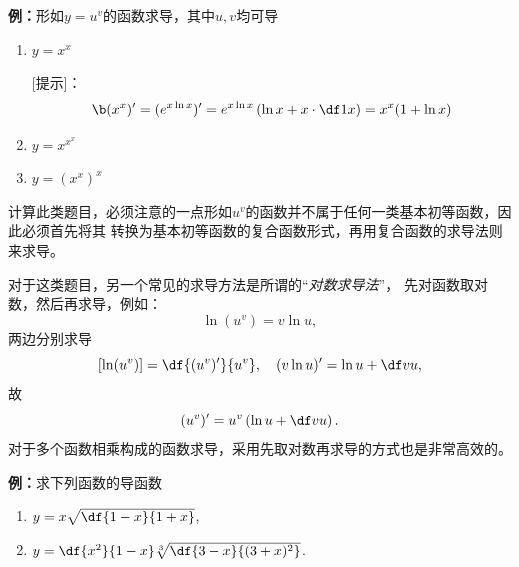 {\bf 例：}形如$y=u^v$的函数求导，其中$u,v$均可导
\begin{enumerate}[(1)]
  \setlength{\itemindent}{1cm}
  \item $y=x^x$
  
  [提示]：
  $${\b (x^x)'=(e^{x\ln x})'=e^{x\ln x}\left(\ln x+x\cdot\df1x\right)
  =x^x(1+\ln x)}$$
  \item $y=x^{x^x}$
  \item $y=\left(x^x\right)^x$
\end{enumerate}

计算此类题目，必须注意的一点形如$u^v$的函数并不属于任何一类基本初等函数，因此必须首先将其
转换为基本初等函数的复合函数形式，再用复合函数的求导法则来求导。

对于这类题目，另一个常见的求导方法是所谓的“{\it 对数求导法}”，
先对函数取对数，然后再求导，例如：
$$\ln(u^v)=v\ln u,$$
两边分别求导
$$[\ln(u^v)]=\df{(u^v)'}{u^v},
\quad (v\ln u)'=\ln u+\df vu,$$
故
$$(u^v)'=u^v\left(\ln u+\df vu\right).$$
对于多个函数相乘构成的函数求导，采用先取对数再求导的方式也是非常高效的。

{\bf 例：}求下列函数的导函数
\begin{enumerate}[(1)]
  \setlength{\itemindent}{1cm}
  \item $y=x\sqrt{\df{1-x}{1+x}}$,
  \item $y=\df{x^2}{1-x}\sqrt[3]{\df{3-x}{(3+x)^2}}$. 
\end{enumerate}

